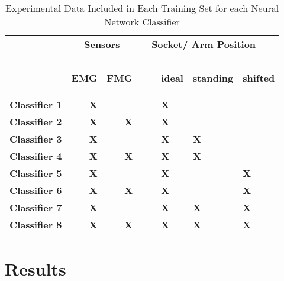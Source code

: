 \documentclass[twocolumn]{sagej}
\begin{document}
\begin{table}[htbp]
  \centering
   \caption{Experimental Data Included in Each Training Set for each Neural Network Classifier}
    \begin{tabular}{lrrrllll}
    \toprule
    \textbf{} & \multicolumn{2}{c}{\textbf{Sensors}} & \textbf{} & \multicolumn{4}{l}{\textbf{Socket/ Arm Position}} \\
    \\
    \\
    \textbf{} & \begin{rotate}{30}\textbf{EMG}\end{rotate}  & \begin{rotate}{30} \textbf{FMG}\end{rotate} & & \textbf{} & \begin{rotate}{30}\textbf{ideal}\end{rotate} &  \begin{rotate}{30}\textbf{standing}\end{rotate} & \begin{rotate}{30} \textbf{shifted} \end{rotate} \\
    \textbf{Classifier 1} & \textbf{X} & \textbf{} & & & \textbf{X} &  \textbf{} & \textbf{} \\
    \textbf{Classifier 2} & \textbf{X} & \textbf{X} & & & \textbf{X} & \textbf{} & \textbf{} \\
    \textbf{Classifier 3} & \textbf{X} & \textbf{} & & & \textbf{X} &  \textbf{X} & \textbf{} \\
    \textbf{Classifier 4} & \textbf{X} & \textbf{X} & & & \textbf{X} & \textbf{X} & \textbf{} \\
    \textbf{Classifier 5} & \textbf{X} & \textbf{} & & & \textbf{X} &  \textbf{} & \textbf{X} \\
    \textbf{Classifier 6} & \textbf{X} & \textbf{X} & & & \textbf{X} & \textbf{} & \textbf{X} \\
    \textbf{Classifier 7} & \textbf{X} & \textbf{} & & & \textbf{X} &  \textbf{X} & \textbf{X} \\
    \textbf{Classifier 8} & \textbf{X} & \textbf{X} & & & \textbf{X} & \textbf{X} & \textbf{X} \\
    \bottomrule
    \end{tabular}%
  \label{tab:groups}%
\end{table}%



\section{Results}
\label{sec:results}
\end{document}
